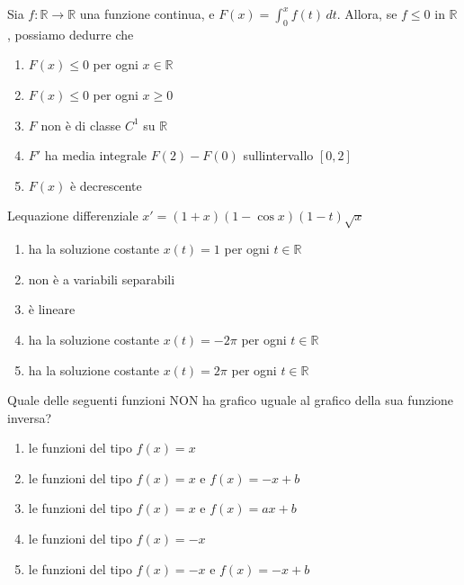 \begin{quiz}
Sia $f:\mathbb R\to\mathbb R$ una funzione continua, e $F(x)=\int_0^x f(t)\,dt$. Allora, se $f\le0$ in $\mathbb R$, possiamo dedurre che
\begin{enumerate}
\item $F(x)\le0$ per ogni $x\in\mathbb R$
\item $F(x)\le0$ per ogni $x\ge0$
\item $F$ non \`e di classe $C^1$ su $\mathbb R$
\item $F\prime$ ha media integrale $F(2)-F(0)$ sull\textquotesingle intervallo $[0,2]$
\item $F(x)$ \`e decrescente
\end{enumerate}
\end{quiz}

\begin{quiz}
L\textquotesingle equazione differenziale $x\prime=(1+x)(1-\cos x)(1-t)\sqrt{x}$
\begin{enumerate}
\item ha la soluzione costante $x(t)=1$ per ogni $t\in\mathbb R$
\item non \`e a variabili separabili
\item \`e lineare
\item ha la soluzione costante $x(t)=-2\pi$ per ogni $t\in\mathbb R$
\item ha la soluzione costante $x(t)=2\pi$ per ogni $t\in\mathbb R$
\end{enumerate}
\end{quiz}

\begin{quiz}
Quale delle seguenti funzioni NON ha grafico uguale al grafico della sua funzione inversa?
\begin{enumerate}
\item le funzioni del tipo $f(x)=x$
\item le funzioni del tipo $f(x)=x$ e $f(x)=-x+b$
\item le funzioni del tipo $f(x)=x$ e $f(x)=ax+b$
\item le funzioni del tipo $f(x)=-x$
\item le funzioni del tipo $f(x)=-x$ e $f(x)=-x+b$
\end{enumerate}
\end{quiz}

